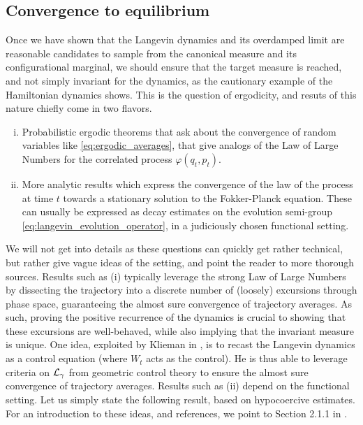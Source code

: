         \subsection{Convergence to equilibrium}
        Once we have shown that the Langevin dynamics and its overdamped limit are reasonable candidates to sample from the canonical measure and its configurational marginal,
        we should ensure that the target measure is reached, and not simply invariant for the dynamics, as the cautionary example of the Hamiltonian dynamics shows.
        This is the question of ergodicity, and resuts of this nature chiefly come in two flavors.
        \begin{enumerate}[(i)]
            \item Probabilistic ergodic theorems that ask about the convergence of random variables like \eqref{eq:ergodic_averages}, that give analogs of the Law of Large Numbers for the correlated process $\varphi(q_t,p_t)$.
            \item More analytic results which express the convergence of the law of the process at time $t$ towards a stationary solution to the Fokker-Planck equation. These can usually be expressed as decay estimates on the evolution semi-group \eqref{eq:langevin_evolution_operator}, in a judiciously chosen functional setting.
        \end{enumerate}
        We will not get into details as these questions can quickly get rather technical, but rather give vague ideas of the setting, and point the reader to more thorough sources.
        Results such as (i) typically leverage the strong Law of Large Numbers by dissecting the trajectory into a discrete number of (loosely) \iid excursions through phase space, guaranteeing the almost sure convergence of trajectory averages.
        As such, proving the positive recurrence of the dynamics is crucial to showing that these excursions are well-behaved, while also implying that the invariant measure is unique.
        One idea, exploited by Klieman in \cite{K87}, is to recast the Langevin dynamics as a control equation (where $W_t$ acts as the control). 
        He is thus able to leverage criteria on $\mathcal{L}_\gamma$ from geometric control theory to ensure the almost sure convergence of trajectory averages.
        Results such as (ii) depend on the functional setting. Let us simply state the following result, based on hypocoercive estimates. 
        For an introduction to these ideas, and references, we point to Section 2.1.1 in \cite{LMS13}.
